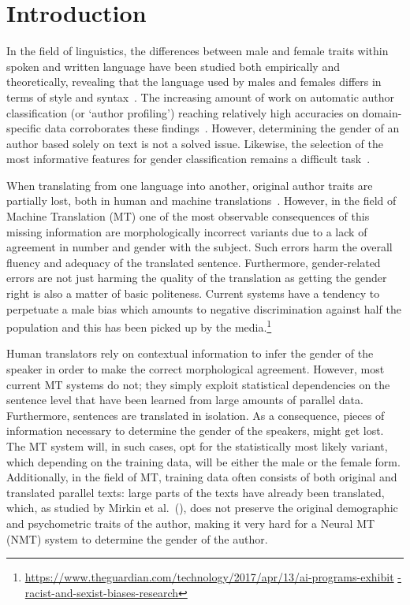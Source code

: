 \section{Introduction}
In the field of linguistics, the differences between male and female traits within spoken and written language have been studied both empirically and theoretically, revealing that the language used by males and females differs in terms of style and syntax~\cite{Coates2015}. The increasing amount of work on automatic author classification (or `author profiling') reaching relatively high accuracies on domain-specific data corroborates these findings~\cite{Rangel2013,santosh2013}. However, determining the gender of an author based solely on text is not a solved issue. Likewise, the selection of the most informative features for gender classification remains a difficult task~\cite{Litvinova2016}.

When translating from one language into another, original author traits are partially lost, both in human and machine translations~\cite{Mirkin2015,Rabinovich2016}. However, in the field of Machine Translation (MT) one of the most observable consequences of this missing information are morphologically incorrect variants due to a lack of agreement in number and gender with the subject. Such errors harm the overall fluency and adequacy of the translated sentence. Furthermore, gender-related errors are not just harming the quality of the translation as getting the gender right is also a matter of basic politeness. Current systems have a tendency to perpetuate a male bias which amounts to negative discrimination against half the population and this has been picked up by the media.\footnote{\url{https://www.theguardian.com/technology/2017/apr/13/ai-programs-exhibit} \url{-racist-and-sexist-biases-research}} 

Human translators rely on contextual information to infer the gender of the speaker in order to make the correct morphological agreement. However, most current MT systems do not; they simply exploit statistical dependencies on the sentence level that have been learned from large amounts of parallel data. Furthermore, sentences are translated in isolation. As a consequence, pieces of information necessary to determine the gender of the speakers, might get lost. The MT system will, in such cases, opt for the statistically most likely variant, which depending on the training data, will be either the male or the female form. Additionally, in the field of MT, training data often consists of both original and translated parallel texts: large parts of the texts have already been translated, which, as studied by Mirkin et al.~(\citeyear{Mirkin2015}), does not preserve the original demographic and psychometric traits of the author, making it very hard for a Neural MT (NMT) system to  determine the gender of the author.

